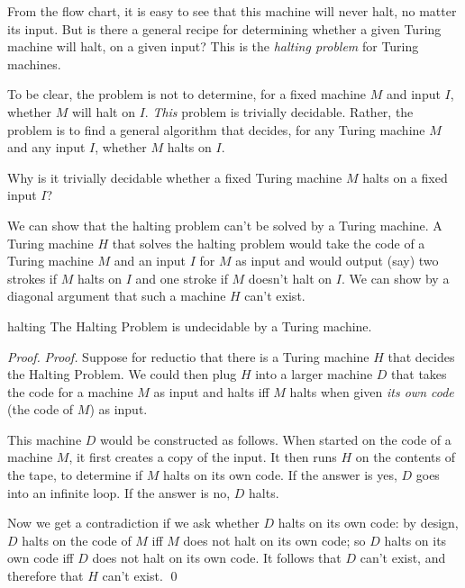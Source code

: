 \begin{center}
  
\end{center}

From the flow chart,
it is easy to see that this machine will never halt,
no matter its input.
But is there a general recipe
for determining whether a given Turing machine will halt,
on a given input?
This is the \textit{halting problem} for Turing machines.

To be clear,
the problem is not to determine,
for a fixed machine $M$ and input $I$,
whether $M$ will halt on $I$.
\emph{This} problem is trivially decidable.
Rather,
the problem is to find a general algorithm that decides,
for any Turing machine $M$ and any input $I$,
whether $M$ halts on $I$.

\begin{exercise}
   Why is it trivially decidable whether a fixed Turing machine $M$ halts on a fixed input $I$?
\end{exercise}

We can show that the halting problem
can't be solved by a Turing machine.
A Turing machine $H$ that solves the halting problem would
take the code of a Turing machine $M$ and an input $I$ for $M$ as input
and would output (say) two strokes if $M$ halts on $I$
and one stroke if $M$ doesn't halt on $I$.
We can show by a diagonal argument that
such a machine $H$ can't exist.

\begin{theorem}{}{halting}
  The Halting Problem is undecidable by a Turing machine.
\end{theorem}

\begin{proof}
  \emph{Proof.}
  Suppose for reductio that
  there is a Turing machine $H$ that decides the Halting Problem.
  We could then plug $H$ into a larger machine $D$ that
  takes the code for a machine $M$ as input
  and halts iff $M$ halts when given \emph{its own code} (the code of $M$) as input.

  This machine $D$ would be constructed as follows.
  When started on the code of a machine $M$,
  it first creates a copy of the input.
  It then runs $H$ on the contents of the tape,
  to determine if $M$ halts on its own code.
  If the answer is yes,
  $D$ goes into an infinite loop.
  If the answer is no,
  $D$ halts.

  Now we get a contradiction if we ask whether $D$ halts on its own code:
  by design,
  $D$ halts on the code of $M$ iff
  $M$ does not halt on its own code;
  so $D$ halts on its own code iff
  $D$ does not halt on its own code.
  It follows that $D$ can't exist,
  and therefore that $H$ can't exist.
  \qed
\end{proof}

